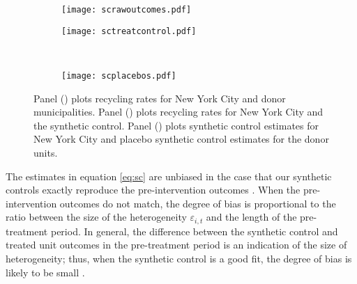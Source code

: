 \documentclass[12pt]{article}
\begin{document}
\begin{figure}
\centering
\begin{subfigure}[t]{.49\textwidth}
    \centering
    \texttt{[image: scrawoutcomes.pdf]}
            \caption{}\label{fig:scrawoutcomes}
    \end{subfigure}
\begin{subfigure}[t]{.49\textwidth}
    \centering
    \texttt{[image: sctreatcontrol.pdf]}
        \caption{}\label{fig:sctreatcontrol}
\end{subfigure} \\
\begin{subfigure}[t]{.49\textwidth}
    \centering
    \vspace{0pt}
     \texttt{[image: scplacebos.pdf]}
        \caption{}\label{fig:scplacebos}
\end{subfigure}
\begin{minipage}[t]{.49\textwidth}
\medskip

\medskip
    \caption{Panel () plots recycling rates for New York City and donor municipalities. Panel () plots recycling rates for New York City and the synthetic control.  Panel () plots synthetic control estimates for New York City and placebo synthetic control estimates for the donor units.} \label{fig:sccomparison}
\end{minipage}
\end{figure}

The estimates in equation \ref{eq:sc} are unbiased in the case that our synthetic controls exactly reproduce the pre-intervention outcomes \citep{abadie2010}. When the pre-intervention outcomes do not match, the degree of bias is proportional to the ratio between the size of the heterogeneity \(\varepsilon_{i,t}\) and the length of the pre-treatment period.  In general, the difference between the synthetic control and treated unit outcomes in the pre-treatment period is an indication of the size of heterogeneity; thus, when the synthetic control is a good fit, the degree of bias is likely to be small \citep{abadie2021}.
\end{document}
